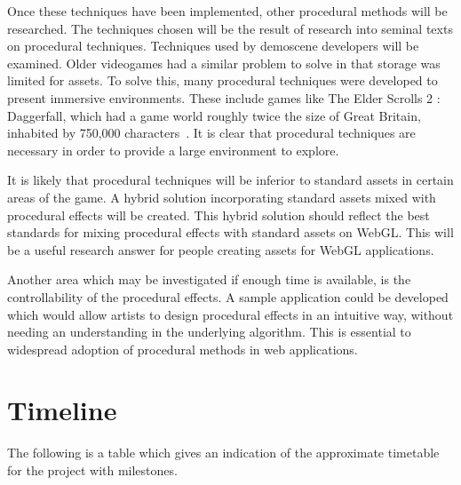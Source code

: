 \documentclass[12pt]{article}
\begin{document}
Once these techniques have been implemented, other procedural methods will be researched.
The techniques chosen will be the result of research into seminal texts on procedural techniques.
Techniques used by demoscene developers will be examined.
Older videogames had a similar problem to solve in that storage was limited for assets.
To solve this, many procedural techniques were developed to present immersive environments.
These include games like The Elder Scrolls 2 : Daggerfall, which had a game world roughly twice the size of Great Britain, inhabited by 750,000 characters~\cite{daggerfall:web}.
It is clear that procedural techniques are necessary in order to provide a large environment to explore.

It is likely that procedural techniques will be inferior to standard assets in certain areas of the game.
A hybrid solution incorporating standard assets mixed with procedural effects will be created.
This hybrid solution should reflect the best standards for mixing procedural effects with standard assets on WebGL.
This will be a useful research answer for people creating assets for WebGL applications.

Another area which may be investigated if enough time is available, is the controllability of the procedural effects.
A sample application could be developed which would allow artists to design procedural effects in an intuitive way, without needing an understanding in the underlying algorithm.
This is essential to widespread adoption of procedural methods in web applications.

\section{Timeline}
The following is a table which gives an indication of the approximate timetable for the project with milestones.\\
\end{document}
